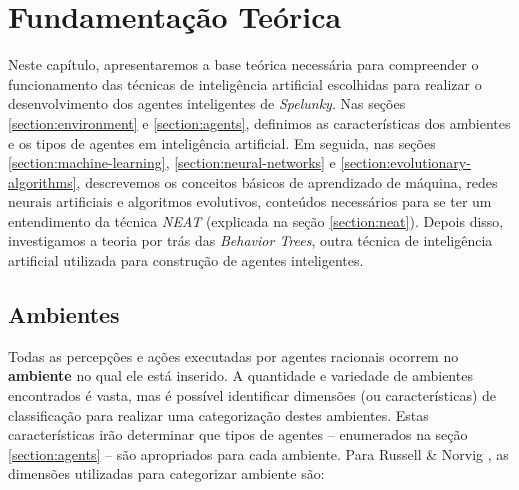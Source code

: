 \chapter{\label{chap:theory}Fundamentação Teórica}
Neste capítulo, apresentaremos a base teórica necessária para compreender o
funcionamento das técnicas de inteligência artificial escolhidas para realizar o
desenvolvimento dos agentes inteligentes de \textit{Spelunky}. Nas seções
\ref{section:environment} e \ref{section:agents}, definimos as características
dos ambientes e os tipos de agentes em inteligência artificial. Em seguida, nas
seções \ref{section:machine-learning}, \ref{section:neural-networks} e
\ref{section:evolutionary-algorithms}, descrevemos os conceitos básicos de
aprendizado de máquina, redes neurais artificiais e algoritmos evolutivos,
conteúdos necessários para se ter um entendimento da técnica \textit{NEAT}
(explicada na seção \ref{section:neat}). Depois disso, investigamos a teoria por
trás das \textit{Behavior Trees}, outra técnica de inteligência artificial
utilizada para construção de agentes inteligentes.


\section{\label{section:environment}Ambientes}
Todas as percepções e ações executadas por agentes racionais ocorrem no
\textbf{ambiente} no qual ele está inserido. A quantidade e variedade de
ambientes encontrados é vasta, mas é possível identificar dimensões (ou
características) de classificação para realizar uma categorização destes
ambientes. Estas características irão determinar que tipos de agentes --
enumerados na seção \ref{section:agents} -- são apropriados para cada ambiente.
Para Russell \& Norvig \cite{RussellNorvig200912}, as dimensões utilizadas para
categorizar ambiente são:

